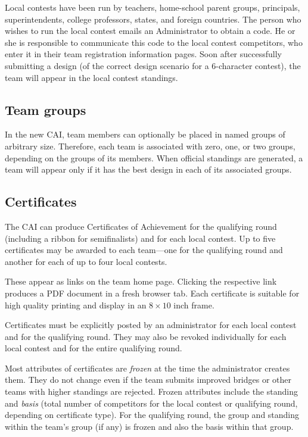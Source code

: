 \documentclass[11pt,letterpaper]{refart}
\begin{document}
Local contests have been run by teachers, home-school parent groups,
principals, superintendents, college professors, states, and foreign
countries. The person who wishes to run the local contest emails an
Administrator to obtain a code. He or she is responsible to
communicate this code to the local contest competitors, who enter it
in their team registration information pages. Soon after successfully
submitting a design (of the correct design scenario for a 6-character
contest), the team will appear in the local contest standings.

\subsection{Team groups}
\label{sec:groups}
In the new CAI, team members can optionally be placed in named groups
of arbitrary size. Therefore, each team is associated with zero, one,
or two groups, depending on the groups of its members. When official
standings are generated, a team will appear only if it has the best
design in each of its associated groups.

\subsection{Certificates}
\label{sec:certificates}
The CAI can produce Certificates of Achievement for the
qualifying round (including a ribbon for semifinalists) and for each
local contest. Up to five certificates may be awarded to each
team---one for the qualifying round and another for each of up to four
local contests.

These appear as links on the team home page. Clicking the respective
link produces a PDF document in a fresh browser tab. Each certificate
is suitable for high quality printing and display in an $8\times 10$
inch frame.

Certificates must be explicitly posted by an administrator for each
local contest and for the qualifying round. They may also be revoked
individually for each local contest and for the entire qualifying
round.

Most attributes of certificates are \emph{frozen} at the time the
administrator creates them. They do not change even if the team
submits improved bridges or other teams with higher standings are
rejected. Frozen attributes include the standing and \emph{basis}
(total number of competitors for the local contest or qualifying
round, depending on certificate type). For the qualifying
round, the group and standing within the team's group (if any) is
frozen and also the basis within that group.
\end{document}
